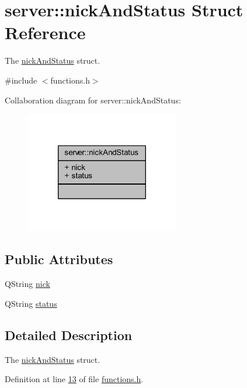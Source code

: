 \hypertarget{structserver_1_1nick_and_status}{\section{server\-:\-:nick\-And\-Status Struct Reference}
\label{da/d6a/structserver_1_1nick_and_status}
}


The \hyperlink{structserver_1_1nick_and_status}{nick\-And\-Status} struct.  




{\ttfamily \#include $<$functions.\-h$>$}



Collaboration diagram for server\-:\-:nick\-And\-Status\-:\nopagebreak
\begin{figure}[H]
\begin{center}
\leavevmode
\includegraphics[width=190pt]{dd/d02/structserver_1_1nick_and_status__coll__graph}
\end{center}
\end{figure}
\subsection*{Public Attributes}
\begin{DoxyCompactItemize}
\item 
Q\-String \hyperlink{structserver_1_1nick_and_status_a891d63cf912fdaa75ad5bac58da22230}{nick}
\item 
Q\-String \hyperlink{structserver_1_1nick_and_status_a33c2bc84bed373bf34f66ebf1f318fc0}{status}
\end{DoxyCompactItemize}


\subsection{Detailed Description}
The \hyperlink{structserver_1_1nick_and_status}{nick\-And\-Status} struct. 

Definition at line \hyperlink{functions_8h_source_l00013}{13} of file \hyperlink{functions_8h_source}{functions.\-h}.




